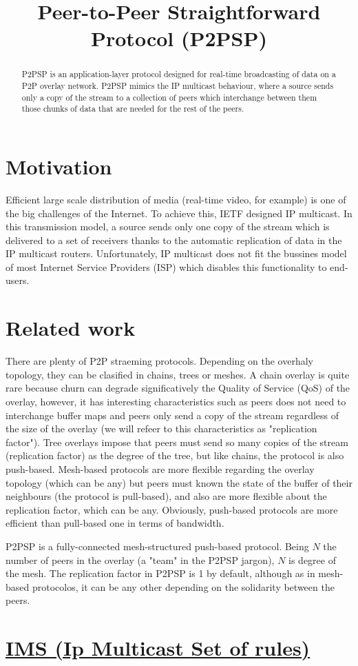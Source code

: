 \documentclass{article}
\title{Peer-to-Peer Straightforward Protocol (P2PSP)}
\begin{document}
\maketitle

\begin{abstract}
  P2PSP is an application-layer protocol designed for real-time
  broadcasting of data on a P2P overlay network. P2PSP mimics the IP
  multicast behaviour, where a source sends only a copy of the stream
  to a collection of peers which interchange between them those chunks
  of data that are needed for the rest of the peers.
\end{abstract}

\section{Motivation}

Efficient large scale distribution of media (real-time video, for
example) is one of the big challenges of the Internet. To achieve
this, IETF designed IP multicast. In this transmission model, a source
sends only one copy of the stream which is delivered to a set of
receivers thanks to the automatic replication of data in the IP
multicast routers. Unfortunately, IP multicast does not fit the
bussines model of most Internet Service Providers (ISP) which disables
this functionality to end-users.

\section{Related work}

There are plenty of P2P straeming protocols. Depending on the overhaly
topology, they can be clasified in chains, trees or meshes. A chain
overlay is quite rare because churn can degrade significatively the
Quality of Service (QoS) of the overlay, however, it has interesting
characteristics such as peers does not need to interchange buffer maps
and peers only send a copy of the stream regardless of the size of the
overlay (we will refeer to this characteristics as "replication
factor"). Tree overlays impose that peers must send so many copies of
the stream (replication factor) as the degree of the tree, but like
chains, the protocol is also push-based. Mesh-based protocols are more
flexible regarding the overlay topology (which can be any) but peers
must known the state of the buffer of their neighbours (the protocol
is pull-based), and also are more flexible about the replication
factor, which can be any. Obviously, push-based protocols are more
efficient than pull-based one in terms of bandwidth.

P2PSP is a fully-connected mesh-structured push-based protocol. Being
$N$ the number of peers in the overlay (a "team" in the P2PSP jargon),
$N$ is degree of the mesh. The replication factor in P2PSP is 1 by
default, although as in mesh-based protocolos, it can be any other
depending on the solidarity between the peers.

\section{\href{IMS/README.md}{IMS (Ip Multicast Set of rules)}}
\end{document}

